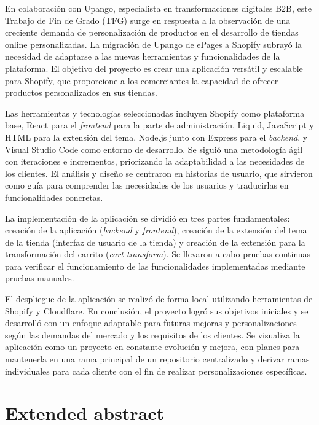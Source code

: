 \documentclass[12pt]{article}
\begin{document}
En colaboración con Upango, especialista en transformaciones digitales B2B, este Trabajo de Fin de Grado (TFG) surge en respuesta a la observación 
de una creciente demanda de personalización de productos en el desarrollo de tiendas online personalizadas. La migración de Upango de ePages 
a Shopify subrayó la necesidad de adaptarse a las nuevas herramientas y funcionalidades de la plataforma. El objetivo del proyecto es crear 
una aplicación versátil y escalable para Shopify, que proporcione a los comerciantes la capacidad de ofrecer productos personalizados en sus tiendas.

Las herramientas y tecnologías seleccionadas incluyen Shopify como plataforma base, React para el \textit{frontend} para la parte de administración, Liquid, JavaScript y HTML 
para la extensión del tema, Node.js junto con Express para el \textit{backend}, 
y Visual Studio Code como entorno de desarrollo. Se siguió una metodología ágil con iteraciones e incrementos, priorizando la adaptabilidad a las 
necesidades de los clientes. El análisis y diseño se centraron en historias de usuario, que sirvieron como guía para comprender las necesidades de los usuarios y 
traducirlas en funcionalidades concretas.

La implementación de la aplicación se dividió en tres partes fundamentales: creación de la aplicación (\textit{backend} y \textit{frontend}), creación de la extensión del tema de la tienda (interfaz de usuario de la tienda) y
creación de la extensión para la transformación del carrito (\textit{cart-transform}). 
Se llevaron a cabo pruebas continuas para verificar el funcionamiento de las funcionalidades implementadas mediante pruebas manuales.

El despliegue de la aplicación se realizó de forma local utilizando herramientas de Shopify y Cloudflare. En conclusión, el proyecto logró sus 
objetivos iniciales y se desarrolló con un enfoque adaptable para futuras mejoras y personalizaciones según las demandas del mercado y los 
requisitos de los clientes. Se visualiza la aplicación como un proyecto en constante evolución y mejora, con planes para mantenerla en una 
rama principal de un repositorio centralizado y derivar ramas individuales para cada cliente con el fin de realizar personalizaciones específicas.

\clearpage

\section{Extended abstract}
\end{document}
